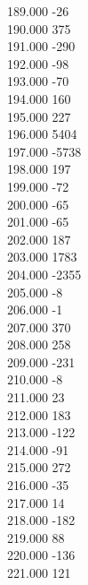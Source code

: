 { 189.000	-26 \\
 190.000	375 \\
 191.000	-290 \\
 192.000	-98 \\
 193.000	-70 \\
 194.000	160 \\
 195.000	227 \\
 196.000	5404 \\
 197.000	-5738 \\
 198.000	197 \\
 199.000	-72 \\
 200.000	-65 \\
 201.000	-65 \\
 202.000	187 \\
 203.000	1783 \\
 204.000	-2355 \\
 205.000	-8 \\
 206.000	-1 \\
 207.000	370 \\
 208.000	258 \\
 209.000	-231 \\
 210.000	-8 \\
 211.000	23 \\
 212.000	183 \\
 213.000	-122 \\
 214.000	-91 \\
 215.000	272 \\
 216.000	-35 \\
 217.000	14 \\
 218.000	-182 \\
 219.000	88 \\
 220.000	-136 \\
 221.000	121 \\
}
